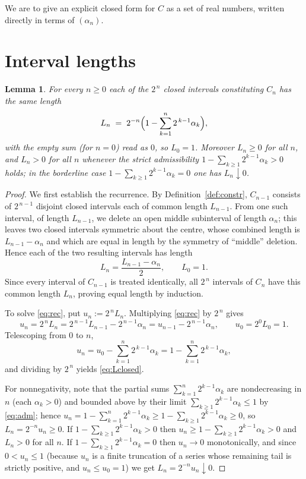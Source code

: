 \documentclass[11pt]{article}
\newtheorem{lemma}{Lemma}
\theoremstyle{definition}
\theoremstyle{remark}
\begin{document}
We are to give an explicit closed form for $C$ as a set of real numbers, written
directly in terms of $(\alpha_n)$.

\section{Interval lengths}

\begin{lemma}\label{lem:length}
For every $n\ge 0$ each of the $2^{\,n}$ closed intervals constituting $C_n$ has
the same length
\begin{equation}\label{eq:Lclosed}
L_n \;=\; 2^{-n}\Bigl(1-\sum_{k=1}^{n}2^{\,k-1}\alpha_k\Bigr),
\end{equation}
with the empty sum (for $n=0$) read as $0$, so $L_0=1$. Moreover $L_n\ge 0$ for
all $n$, and $L_n>0$ for all $n$ whenever the strict admissibility
$1-\sum_{k\ge1}2^{k-1}\alpha_k>0$ holds; in the borderline case
$1-\sum_{k\ge1}2^{k-1}\alpha_k=0$ one has $L_n\downarrow 0$.
\end{lemma}

\begin{proof}
We first establish the recurrence. By Definition~\ref{def:constr}, $C_{n-1}$
consists of $2^{\,n-1}$ disjoint closed intervals each of common length
$L_{n-1}$. From one such interval, of length $L_{n-1}$, we delete an open middle
subinterval of length $\alpha_n$; this leaves two closed intervals symmetric
about the centre, whose combined length is $L_{n-1}-\alpha_n$ and which are equal
in length by the symmetry of ``middle'' deletion. Hence each of the two
resulting intervals has length
\begin{equation}\label{eq:rec}
L_n=\frac{L_{n-1}-\alpha_n}{2},\qquad L_0=1.
\end{equation}
Since every interval of $C_{n-1}$ is treated identically, all $2^{\,n}$ intervals
of $C_n$ have this common length $L_n$, proving equal length by induction.

To solve \eqref{eq:rec}, put $u_n:=2^{\,n}L_n$. Multiplying \eqref{eq:rec} by
$2^{\,n}$ gives
\[
u_n=2^{\,n}L_n=2^{\,n-1}L_{n-1}-2^{\,n-1}\alpha_n=u_{n-1}-2^{\,n-1}\alpha_n,
\qquad u_0=2^0L_0=1 .
\]
Telescoping from $0$ to $n$,
\[
u_n=u_0-\sum_{k=1}^{n}2^{\,k-1}\alpha_k=1-\sum_{k=1}^{n}2^{\,k-1}\alpha_k ,
\]
and dividing by $2^{\,n}$ yields \eqref{eq:Lclosed}.

For nonnegativity, note that the partial sums $\sum_{k=1}^{n}2^{k-1}\alpha_k$ are
nondecreasing in $n$ (each $\alpha_k>0$) and bounded above by their limit
$\sum_{k\ge1}2^{k-1}\alpha_k\le 1$ by \eqref{eq:adm}; hence
$u_n=1-\sum_{k=1}^n 2^{k-1}\alpha_k\ge 1-\sum_{k\ge1}2^{k-1}\alpha_k\ge 0$, so
$L_n=2^{-n}u_n\ge0$. If $1-\sum_{k\ge1}2^{k-1}\alpha_k>0$ then $u_n\ge
1-\sum_{k\ge1}2^{k-1}\alpha_k>0$ and $L_n>0$ for all $n$. If
$1-\sum_{k\ge1}2^{k-1}\alpha_k=0$ then $u_n\to 0$ monotonically, and since
$0<u_n\le 1$ (because $u_n$ is a finite truncation of a series whose remaining
tail is strictly positive, and $u_n\le u_0=1$) we get $L_n=2^{-n}u_n\downarrow
0$.
\end{proof}
\end{document}
